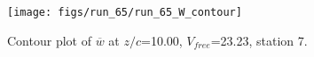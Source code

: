 \begin{figure}[H]
\centering
\texttt{[image: figs/run\_65/run\_65\_W\_contour]}
\caption{Contour plot of $\overline{w}$ at $z/c$=10.00, $V_{free}$=23.23, station 7.}
\end{figure}


